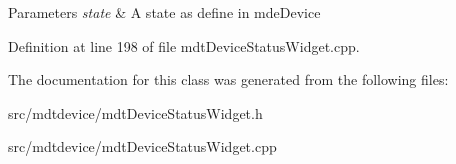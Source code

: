 \begin{DoxyParams}{Parameters}
{\em state} & A state as define in mdeDevice \\
\hline
\end{DoxyParams}


Definition at line 198 of file mdtDeviceStatusWidget.cpp.



The documentation for this class was generated from the following files:\begin{DoxyCompactItemize}
\item 
src/mdtdevice/mdtDeviceStatusWidget.h\item 
src/mdtdevice/mdtDeviceStatusWidget.cpp\end{DoxyCompactItemize}
